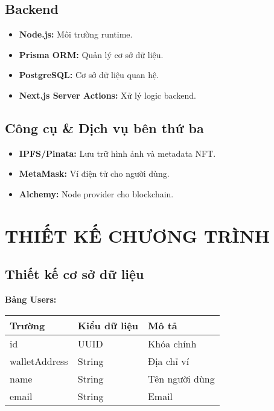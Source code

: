 \documentclass[a4paper,12pt]{report}
\begin{document}
\section{Backend}
\begin{itemize}
    \item \textbf{Node.js:} Môi trường runtime.
    \item \textbf{Prisma ORM:} Quản lý cơ sở dữ liệu.
    \item \textbf{PostgreSQL:} Cơ sở dữ liệu quan hệ.
    \item \textbf{Next.js Server Actions:} Xử lý logic backend.
\end{itemize}

\section{Công cụ \& Dịch vụ bên thứ ba}
\begin{itemize}
    \item \textbf{IPFS/Pinata:} Lưu trữ hình ảnh và metadata NFT.
    \item \textbf{MetaMask:} Ví điện tử cho người dùng.
    \item \textbf{Alchemy:} Node provider cho blockchain.
\end{itemize}

\chapter{THIẾT KẾ CHƯƠNG TRÌNH}

\section{Thiết kế cơ sở dữ liệu}

\textbf{Bảng Users:}
\begin{center}
\begin{tabular}{|l|l|p{6cm}|}
    \hline
    \textbf{Trường} & \textbf{Kiểu dữ liệu} & \textbf{Mô tả} \\
    \hline
    id & UUID & Khóa chính \\
    \hline
    walletAddress & String & Địa chỉ ví \\
    \hline
    name & String & Tên người dùng \\
    \hline
    email & String & Email \\
    \hline
\end{tabular}
\end{center}
\end{document}
